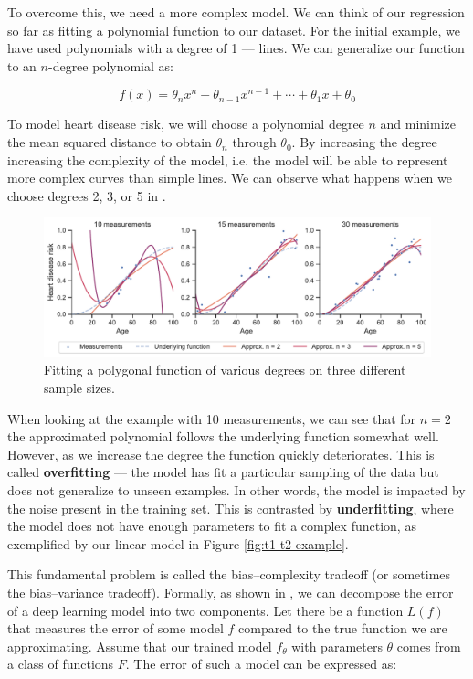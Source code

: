To overcome this, we need a more complex model. We can think of our regression so far as fitting a polynomial function to our dataset. For the initial example, we have used polynomials with a degree of 1 --- lines. We can generalize our function to an $n$-degree polynomial as:

\begin{equation}
	f(x) = \theta_n x^n + \theta_{n-1}x^{n-1} + \cdots + \theta_1 x + \theta_0
\end{equation}

To model heart disease risk, we will choose a polynomial degree $n$ and minimize the mean squared distance to obtain $\theta_n$ through $\theta_0$. By increasing the degree increasing the complexity of the model, i.e. the model will be able to represent more complex curves than simple lines. We can observe what happens when we choose degrees 2, 3, or 5 in .

\begin{figure}[h!]
 \centering
 \includegraphics[width=\linewidth]{images/3/heart_disease_risk_samples_degrees}
 \caption{Fitting a polygonal function of various degrees on three different sample sizes.}
 \label{fig:reg-deg-2}
\end{figure}

When looking at the example with 10 measurements, we can see that for $n = 2$ the approximated polynomial follows the underlying function somewhat well. However, as we increase the degree the function quickly deteriorates. This is called \textbf{overfitting} --- the model has fit a particular sampling of the data but does not generalize to unseen examples. In other words, the model is impacted by the noise present in the training set. This is contrasted by \textbf{underfitting}, where the model does not have enough parameters to fit a complex function, as exemplified by our linear model in Figure \ref{fig:t1-t2-example}.

This fundamental problem is called the bias--complexity tradeoff (or sometimes the bias--variance tradeoff). Formally, as shown in , we can decompose the error of a deep learning model into two components. Let there be a function $L(f)$ that measures the error of some model $f$ compared to the true function we are approximating. Assume that our trained model $f_\theta$ with parameters $\theta$ comes from a class of functions $F$. The error of such a model can be expressed as:

